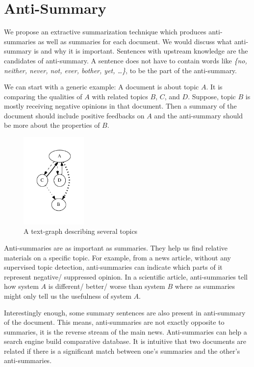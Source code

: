\documentclass[a4paper]{report}
\begin{document}
\section{Anti-Summary}
We propose an extractive summarization technique which produces anti-summaries as well as summaries for each document. We would discuss what anti-summary is and why it is important. Sentences with upstream knowledge
are the candidates of anti-summary. A sentence does not have to contain words like \emph{\{no, neither, never, not, ever, bother, yet, \dots\}}, to be the part of the anti-summary. 
\par We can start with a generic example:  A document is about topic $A$. It is comparing the qualities of $A$ with related topics $B$, $C$, and $D$. Suppose, topic $B$ is mostly receiving negative opinions in that document. Then a summary of the document should include positive feedbacks on $A$ and the anti-summary should be more about the properties of $B$.
\vspace{-.25in}
\begin{figure}
\begin{center}
\includegraphics[width = 0.29\textwidth, scale = .22, angle = 90]{testGraph.pdf}
\vspace{-.45 in}
\caption{A text-graph describing several topics}
\end{center}
\end{figure}
\vspace{-.3 in}
\par Anti-summaries are as important as summaries.  They help us find relative materials on a specific topic. For example, from a news article, without any supervised topic detection, anti-summaries can indicate which parts of it represent negative/ suppressed opinion. In a scientific article, anti-summaries tell how system $A$ is different/ better/ worse than system $B$ where as summaries might only tell us the usefulness of system $A$.  
\par Interestingly enough, some summary sentences are also present in anti-summary of the document. This means, anti-summaries are not exactly opposite to summaries, it is the reverse stream of the main news. Anti-summaries can help a search engine build comparative database. It is intuitive that two documents are related if there is a significant match between one's summaries and the other's anti-summaries.
\end{document}
